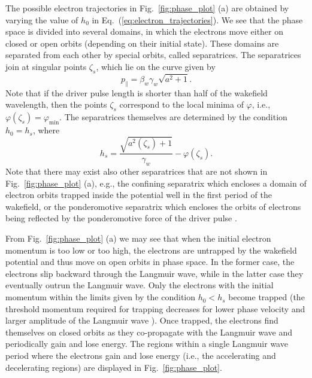 \documentclass[10pt, a4paper, twoside, openright]{report}
\begin{document}
The possible electron trajectories in Fig.~\ref{fig:phase_plot} (a) are obtained by varying the value of $ h_0 $ in Eq.~(\ref{eq:electron_trajectories}). We see that the phase space is divided into several domains, in which the electrons move either on closed or open orbits (depending on their initial state). These domains are separated from each other by special orbits, called separatrices. The separatrices join at singular points $ \zeta_s $, which lie on the curve given by \cite{Esirkepov2006}
\begin{equation}\label{eq:singular_points}
	p_{\parallel} = \beta_w \gamma_w \sqrt{a^2 + 1}.
\end{equation}
Note that if the driver pulse length is shorter than half of the wakefield wavelength, then the points $ \zeta_s $ correspond to the local minima of $ \varphi $, i.e., $ \varphi \left( \zeta_s \right) = \varphi_{\mathrm{min}} $. The separatrices themselves are determined by the condition $ h_0 = h_s $, where \cite{Esirkepov2006, Schroeder2006, Esarey2009}
\begin{equation}\label{eq:separatrix}
	h_s = \frac{\sqrt{a^2 \left( \zeta_{s} \right) + 1}}{\gamma_w} - \varphi \left( \zeta_{s} \right).
\end{equation}
Note that there may exist also other separatrices that are not shown in Fig.~\ref{fig:phase_plot} (a), e.g., the confining separatrix which encloses a domain of electron orbits trapped inside the potential well in the first period of the wakefield, or the ponderomotive separatrix which encloses the orbits of electrons being reflected by the ponderomotive force of the driver pulse \cite{Esirkepov2006}.

From Fig.~\ref{fig:phase_plot} (a) we may see that when the initial electron momentum is too low or too high, the electrons are untrapped by the wakefield potential and thus move on open orbits in phase space. In the former case, the electrons slip backward through the Langmuir wave, while in the latter case they eventually outrun the Langmuir wave. Only the electrons with the initial momentum within the limits given by the condition $ h_0 < h_s $ become trapped (the threshold momentum required for trapping decreases for lower phase velocity and larger amplitude of the Langmuir wave \cite{Schroeder2006}). Once trapped, the electrons find themselves on closed orbits as they co-propagate with the Langmuir wave and periodically gain and lose energy. The regions within a single Langmuir wave period where the electrons gain and lose energy (i.e., the accelerating and decelerating regions) are displayed in Fig.~\ref{fig:phase_plot}. 
\end{document}
